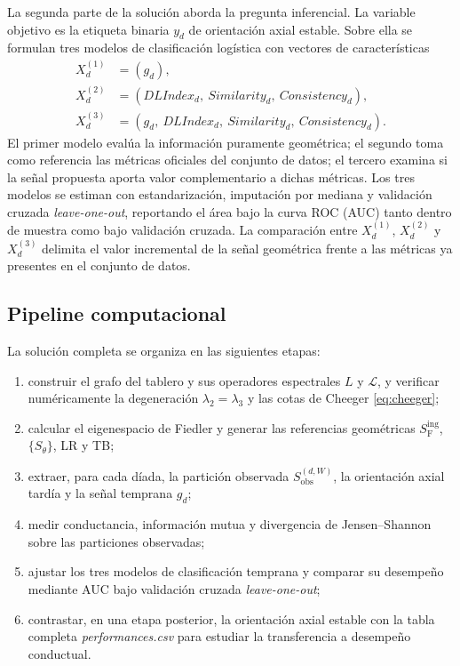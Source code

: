 \documentclass[journal]{IEEEtran}
\newcommand{\Sobs}{S_{\mathrm{obs}}}
\newcommand{\Sing}{S^{\mathrm{ing}}_{\mathrm{F}}}
\begin{document}
La segunda parte de la solución aborda la pregunta inferencial. La variable objetivo es la etiqueta binaria $y_d$ de orientación axial estable. Sobre ella se formulan tres modelos de clasificación logística con vectores de características
\begin{align}
X_d^{(1)} &= (g_d),\\
X_d^{(2)} &= (DLIndex_d,\ Similarity_d,\ Consistency_d),\\
X_d^{(3)} &= (g_d,\ DLIndex_d,\ Similarity_d,\ Consistency_d).
\end{align}
El primer modelo evalúa la información puramente geométrica; el segundo toma como referencia las métricas oficiales del conjunto de datos; el tercero examina si la señal propuesta aporta valor complementario a dichas métricas. Los tres modelos se estiman con estandarización, imputación por mediana y validación cruzada \emph{leave-one-out}, reportando el área bajo la curva ROC (AUC) tanto dentro de muestra como bajo validación cruzada. La comparación entre $X_d^{(1)}$, $X_d^{(2)}$ y $X_d^{(3)}$ delimita el valor incremental de la señal geométrica frente a las métricas ya presentes en el conjunto de datos.

\subsection{Pipeline computacional}

La solución completa se organiza en las siguientes etapas:
\begin{enumerate}
\item construir el grafo del tablero y sus operadores espectrales $L$ y $\mathcal{L}$, y verificar numéricamente la degeneración $\lambda_2 = \lambda_3$ y las cotas de Cheeger \eqref{eq:cheeger};
\item calcular el eigenespacio de Fiedler y generar las referencias geométricas $\Sing$, $\{S_\theta\}$, LR y TB;
\item extraer, para cada díada, la partición observada $\Sobs^{(d,W)}$, la orientación axial tardía y la señal temprana $g_d$;
\item medir conductancia, información mutua y divergencia de Jensen--Shannon sobre las particiones observadas;
\item ajustar los tres modelos de clasificación temprana y comparar su desempeño mediante AUC bajo validación cruzada \emph{leave-one-out};
\item contrastar, en una etapa posterior, la orientación axial estable con la tabla completa \emph{performances.csv} para estudiar la transferencia a desempeño conductual.
\end{enumerate}
\end{document}
